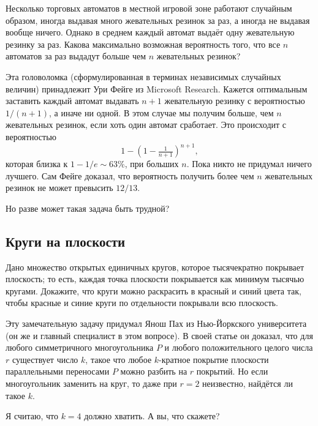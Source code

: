 Несколько торговых автоматов в местной игровой зоне работают случайным образом,
иногда выдавая много жевательных резинок за раз, а иногда не выдавая вообще ничего.
Однако в среднем каждый автомат выдаёт одну жевательную резинку за раз.
Какова максимально возможная вероятность того, что все $n$ автоматов за раз выдадут больше чем $n$ жевательных резинок?

\medskip

Эта головоломка (сформулированная в терминах независимых случайных величин) принадлежит Ури Фейге из Microsoft Research.
Кажется оптимальным заставить каждый автомат выдавать $n + 1$ жевательную резинку с вероятностью $1/(n + 1)$,
а иначе ни одной.
В этом случае мы получим больше, чем $n$ жевательных резинок, если хоть один автомат сработает.
Это происходит с вероятностью
\[1-(1-\tfrac1{n+1})^{n+1},\]
которая близка к $1 - 1/e \sim 63\%$, при больших $n$.
Пока никто не придумал ничего лучшего.
Сам Фейге доказал, что вероятность получить более чем $n$ жевательных резинок не может превысить $12/13$.

Но разве может такая задача быть трудной?

\subsection*{Круги на плоскости}

Дано множество открытых единичных кругов, которое тысячекратно покрывает плоскость;
то есть, каждая точка плоскости покрывается как минимум тысячью кругами.
Докажите, что круги можно раскрасить в красный и синий цвета так,
чтобы красные и синие круги по отдельности покрывали всю плоскость.

\medskip

Эту замечательную задачу придумал Янош Пах из Нью-Йоркского университета (он же и главный специалист в этом вопросе).
В своей статье \cite{46} он доказал, что для любого симметричного многоугольника $P$ и любого положительного целого числа $r$ существует число $k$, такое что любое $k$-кратное покрытие плоскости параллельными переносами $P$ можно разбить на $r$ покрытий.
Но если многоугольник заменить на круг, то даже при $r = 2$ неизвестно, найдётся ли такое $k$.

Я считаю, что $k = 4$ должно хватить.
А вы, что скажете?
